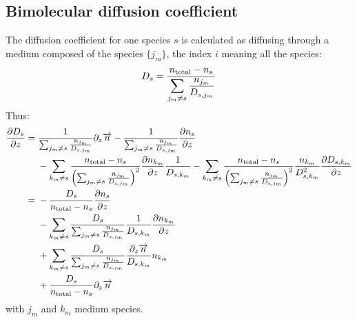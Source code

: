 \subsection{Bimolecular diffusion coefficient}

The diffusion coefficient for one species $s$ is calculated as diffusing through
a medium composed of the species $\{j_m\}$, the index $i$ meaning all the
species:
\begin{equation}
D_s = \frac{n_\text{total} - n_s}{\displaystyle\sum_{j_m \neq s}\frac{n_{j_m}}{D_{s,j_m}}}
\label{Titan:Ds}
\end{equation}
Thus:
\begin{equation}
\begin{split}
\frac{\partial D_s}{\partial z} = &\;   \frac{1}{\sum_{j_m \neq s}\frac{n_{j_m}}{D_{s,j_m}}}\partial_{z}{\overrightarrow{n}} 
                        - \frac{1}{\sum_{j_m \neq s}\frac{n_{j_m}}{D_{s,j_m}}}\frac{\partial n_s}{\partial z} \\
                    &\; - \sum_{k_m\neq s}\frac{n_\text{total} - n_s}{\left(\sum_{j_m \neq s}\frac{n_{j_m}}{D_{s,j_m}}\right)^2}
                                \frac{\partial n_{k_m}}{\partial z}\frac{1}{D_{s,k_m}} 
                        -  \sum_{k_m\neq s}\frac{n_\text{total} - n_s}{\left(\sum_{j_m \neq s}\frac{n_{j_m}}{D_{s,j_m}}\right)^2} 
                                \frac{n_{k_m}}{D_{s,k_m}^2}\frac{\partial D_{s,k_m}}{\partial z}\\
                  = &\; - \frac{D_s}{n_\text{total} - n_s}\frac{\partial n_s}{\partial z} \\
                    &\; - \sum_{k_m\neq s}\frac{D_s}{\sum_{j_m \neq s}\frac{n_{j_m}}{D_{s,j_m}}}
                                \frac{1}{D_{s,k_m}} \frac{\partial n_{k_m}}{\partial z} \\
                    &\; +  \sum_{k_m\neq s}\frac{D_s}{\sum_{j_m \neq s}\frac{n_{j_m}}{D_{s,j_m}}} 
                                \frac{\partial_{z}{\overrightarrow{n}}}{D_{s,k_m}}n_{k_m} \\
                    &\; + \frac{D_s}{n_\text{total} - n_s}\partial_{z}{\overrightarrow{n}} \\
\end{split}
\label{Titan:dDs_dz}
\end{equation}
with $j_m$ and $k_m$ medium species.

